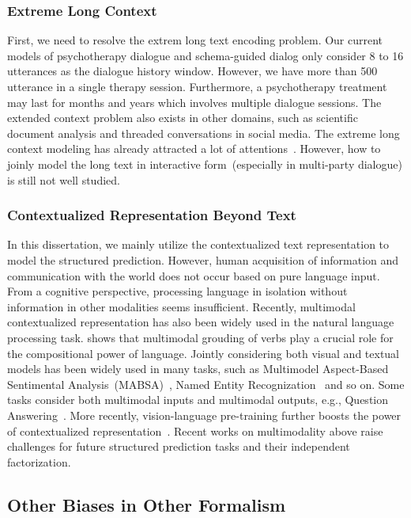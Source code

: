 \subsubsection{Extreme Long Context}
\label{sssec:future:extrem-long-context}
First, we need to resolve the extrem long text encoding problem. Our
current models of psychotherapy dialogue and schema-guided dialog only
consider 8 to 16 utterances as the dialogue history window. However,
we have more than 500 utterance in a single therapy
session. Furthermore, a psychotherapy treatment may last for months
and years which involves multiple dialogue sessions. The extended
context problem also exists in other domains, such as scientific
document analysis and threaded conversations in social media. The
extreme long context modeling has already attracted a lot of
attentions~\citep{tay2020long,gu2021efficiently}. However, how to
joinly model the long text in interactive form~(especially in
multi-party dialogue) is still not well studied.


\subsubsection{Contextualized Representation Beyond Text}
\label{sssec:future:beyond-text}
In this dissertation, we mainly utilize the contextualized text
representation to model the structured prediction. However, human
acquisition of information and communication with the world does not
occur based on pure language input. From a cognitive perspective,
processing language in isolation without information in other
modalities seems insufficient. Recently, multimodal contextualized
representation has also been widely used in the natural language
processing task. \citet{beinborn-etal-2018-multimodal} shows that
multimodal grouding of verbs play a crucial role for the compositional
power of language. Jointly considering both visual and textual models
has been widely used in many tasks, such as Multimodel Aspect-Based
Sentimental Analysis~(MABSA)~\cite{ju2021joint}, Named Entity
Recognization~\cite{zhang2021multi} and so on. Some tasks consider
both multimodal inputs and multimodal outputs, e.g., Question
Answering~\cite{singh-etal-2021-mimoqa}. More recently,
vision-language pre-training further boosts the power of
contextualized
representation~\cite{lu2019vilbert,ling-etal-2022-vision}. Recent
works on multimodality above raise challenges for future structured
prediction tasks and their independent factorization.

\subsection{Other Biases in Other Formalism}
\label{ssec:future:other-biases}

